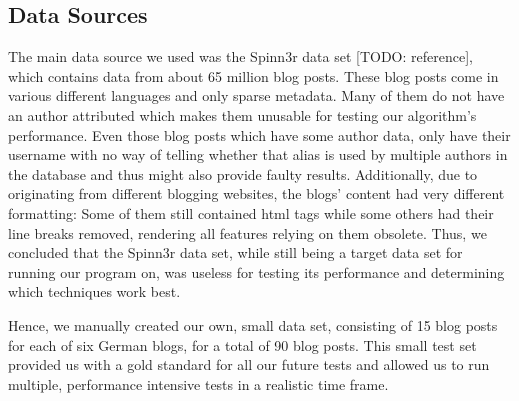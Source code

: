 
\subsection{Data Sources}
\label{sec:data_sources}

The main data source we used was the Spinn3r data set [TODO: reference], which contains data from about 65 million blog posts.
These blog posts come in various different languages and only sparse metadata.
Many of them do not have an author attributed which makes them unusable for testing our algorithm's performance.
Even those blog posts which have some author data, only have their username with no way of telling whether that alias is used by multiple authors in the database and thus might also provide faulty results.
Additionally, due to originating from different blogging websites, the blogs' content had very different formatting: Some of them still contained html tags while some others had their line breaks removed, rendering all features relying on them obsolete. %
Thus, we concluded that the Spinn3r data set, while still being a target data set for running our program on, was useless for testing its performance and determining which techniques work best.


Hence, we manually created our own, small data set, consisting of 15 blog posts for each of six German blogs, for a total of 90 blog posts.
This small test set provided us with a gold standard for all our future tests and allowed us to run multiple, performance intensive tests in a realistic time frame.